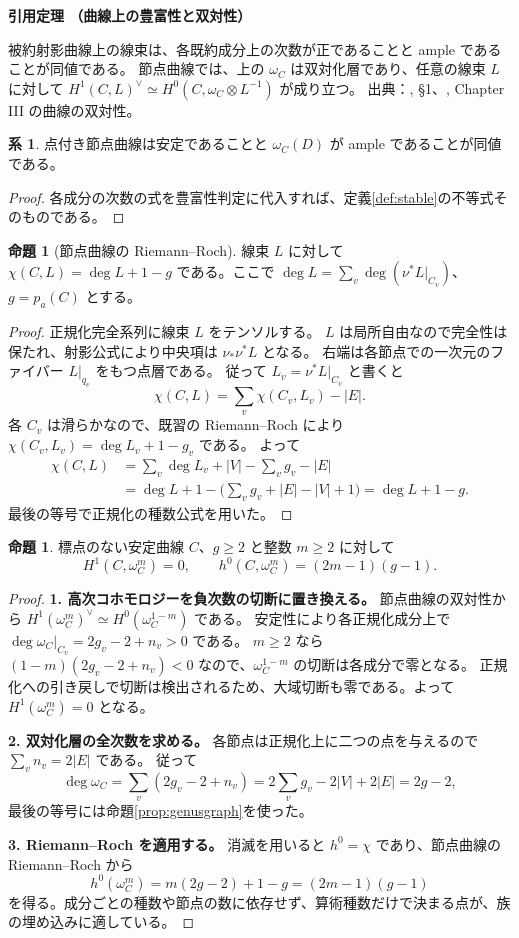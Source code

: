 \documentclass[dvipdfmx,a4paper,11pt]{article}
\theoremstyle{definition}
\newtheorem{prop}[thm]{命題}
\newtheorem{cor}[thm]{系}
\newenvironment{external}[1]{\Needspace{7\baselineskip}\refstepcounter{thm}\begin{tcolorbox}[mybox,colback=blue!2,colframe=blue!40!black]\textbf{引用定理 \thethm（#1）}\par}{\end{tcolorbox}}
\begin{document}
\begin{external}{曲線上の豊富性と双対性}\label{input:nodalduality}
被約射影曲線上の線束は、各既約成分上の次数が正であることと ample であることが同値である。
節点曲線では、上の $\omega_C$ は双対化層であり、任意の線束 $L$ に対して
$H^1(C,L)^\vee\simeq H^0(C,\omega_C\otimes L^{-1})$ が成り立つ。
出典：\cite{DM}, \S1、\cite{Hartshorne}, Chapter III の曲線の双対性。
\end{external}
\begin{cor}\label{cor:stableample}
点付き節点曲線は安定であることと $\omega_C(D)$ が ample であることが同値である。
\end{cor}
\begin{proof}
各成分の次数の式を豊富性判定に代入すれば、定義\ref{def:stable}の不等式そのものである。
\end{proof}

\begin{prop}[節点曲線の Riemann--Roch]
線束 $L$ に対して $\chi(C,L)=\deg L+1-g$ である。ここで $\deg L=\sum_v\deg(\nu^*L|_{C_v})$、$g=p_a(C)$ とする。
\end{prop}
\begin{proof}
正規化完全系列に線束 $L$ をテンソルする。
$L$ は局所自由なので完全性は保たれ、射影公式により中央項は $\nu_*\nu^*L$ となる。
右端は各節点での一次元のファイバー $L|_{q_e}$ をもつ点層である。
従って $L_v=\nu^*L|_{C_v}$ と書くと
\[
\chi(C,L)=\sum_v\chi(C_v,L_v)-|E|.
\]
各 $C_v$ は滑らかなので、既習の Riemann--Roch により $\chi(C_v,L_v)=\deg L_v+1-g_v$ である。
よって
\begin{align*}
\chi(C,L)
&=\sum_v\deg L_v+|V|-\sum_vg_v-|E|\\
&=\deg L+1-\bigl(\sum_vg_v+|E|-|V|+1\bigr)
=\deg L+1-g.
\end{align*}
最後の等号で正規化の種数公式を用いた。
\end{proof}

\begin{prop}\label{prop:plurih0}
標点のない安定曲線 $C$、$g\ge2$ と整数 $m\ge2$ に対して
\[
H^1(C,\omega_C^m)=0,\qquad h^0(C,\omega_C^m)=(2m-1)(g-1).
\]
\end{prop}
\begin{proof}
\textbf{1. 高次コホモロジーを負次数の切断に置き換える。}
節点曲線の双対性から
$H^1(\omega_C^m)^\vee\simeq H^0(\omega_C^{1-m})$ である。
安定性により各正規化成分上で $\deg\omega_C|_{C_v}=2g_v-2+n_v>0$ である。
$m\ge2$ なら $(1-m)(2g_v-2+n_v)<0$ なので、$\omega_C^{1-m}$ の切断は各成分で零となる。
正規化への引き戻しで切断は検出されるため、大域切断も零である。よって $H^1(\omega_C^m)=0$ となる。

\textbf{2. 双対化層の全次数を求める。}
各節点は正規化上に二つの点を与えるので $\sum_v n_v=2|E|$ である。
従って
\[
\deg\omega_C=\sum_v(2g_v-2+n_v)
=2\sum_vg_v-2|V|+2|E|=2g-2,
\]
最後の等号には命題\ref{prop:genusgraph}を使った。

\textbf{3. Riemann--Roch を適用する。}
消滅を用いると $h^0=\chi$ であり、節点曲線の Riemann--Roch から
\[
h^0(\omega_C^m)=m(2g-2)+1-g=(2m-1)(g-1)
\]
を得る。成分ごとの種数や節点の数に依存せず、算術種数だけで決まる点が、族の埋め込みに適している。
\end{proof}
\end{document}
